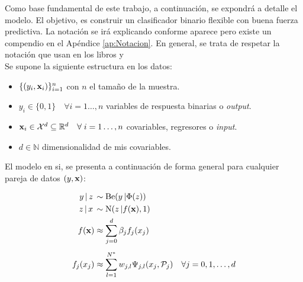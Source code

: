 \documentclass[../Main/Main.tex]{subfiles}
\begin{document}
Como base fundamental de este trabajo, a continuación, se expondrá a detalle el modelo. El objetivo, es construir un clasificador binario flexible con buena fuerza predictiva. La notación se irá explicando conforme aparece pero existe un compendio en el Apéndice \ref{ap:Notacion}. En general, se trata de respetar la notación que usan en los libros \autocite{hastie2008elements} y \autocite{james2013introduction}\\

Se supone la siguiente estructura en los datos:
\begin{itemize}
	\item $\{(y_i,\mathbf{x}_i)\}_{i = 1}^n$ con $n$ el tamaño de la muestra.
	\item $y_i \in \{0,1\}\quad \forall i = 1\ldots,n$  variables de respuesta binarias o \textit{output}.
	\item $\mathbf{x}_i \in \mathcal{X}^d \subseteq \mathbb{R}^d \quad \forall \; i = 1\ldots,n$ covariables, regresores o \textit{input}.
	\item $d \in \mathbb{N}$ dimensionalidad de mis covariables.
\end{itemize}

El modelo en si, se presenta a continuación de forma general para cualquier pareja de datos $(y,\mathbf{x})$:

\begin{align}
y\,|\,z\, &\sim \text{Be}(y\,|\Phi(z)) \label{ec:Y-Z} \\ 
z\,|\,x\, &\sim \text{N}(z\,|f(\mathbf{x}),1) \label{ec:Z-X}\\
f(\mathbf{x}) &\approx \sum_{j=0}^d \beta_j f_j(x_j) \label{ec:fproy} \\[4pt]
f_j(x_j) &\approx \sum_{l = 1}^{N^*} w_{j,l} \Psi_{j,l}(x_j, \mathcal{P}_j) \quad \forall j= 0,1,\ldots,d \label{ec:fj}
\end{align}	
\end{document}
